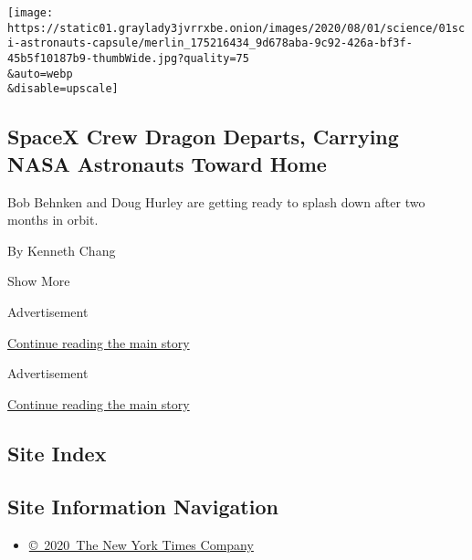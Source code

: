 \begin{enumerate}
  \texttt{[image: https://static01.graylady3jvrrxbe.onion/images/2020/08/01/science/01sci-astronauts-capsule/merlin\_175216434\_9d678aba-9c92-426a-bf3f-45b5f10187b9-thumbWide.jpg?quality=75\\\&auto=webp\\\&disable=upscale]}

  \hypertarget{spacex-crew-dragon-departs-carrying-nasa-astronauts-toward-home}{%
  \subsection{SpaceX Crew Dragon Departs, Carrying NASA Astronauts
  Toward
  Home}\label{spacex-crew-dragon-departs-carrying-nasa-astronauts-toward-home}}

  Bob Behnken and Doug Hurley are getting ready to splash down after two
  months in orbit.

  By Kenneth Chang
\end{enumerate}

Show More

Advertisement

\protect\hyperlink{after-mid2}{Continue reading the main story}

Advertisement

\protect\hyperlink{after-mktg}{Continue reading the main story}

\hypertarget{site-index}{%
\subsection{Site Index}\label{site-index}}

\hypertarget{site-information-navigation}{%
\subsection{Site Information
Navigation}\label{site-information-navigation}}

\begin{itemize}
\tightlist
\item
  \href{https://help.nytimes3xbfgragh.onion/hc/en-us/articles/115014792127-Copyright-notice}{©~2020~The
  New York Times Company}
\end{itemize}

